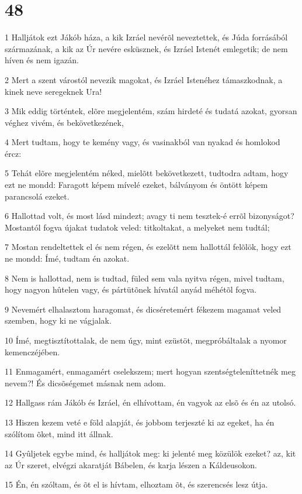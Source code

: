 \chapter{48}

\par 1 Halljátok ezt Jákób háza, a kik Izráel nevérõl neveztettek, és Júda forrásából származának, a kik az Úr nevére esküsznek, és Izráel Istenét emlegetik; de nem híven és nem igazán.
\par 2 Mert a szent várostól nevezik magokat, és Izráel Istenéhez támaszkodnak, a kinek neve seregeknek Ura!
\par 3 Mik eddig történtek, elõre megjelentém, szám hirdeté és tudatá azokat, gyorsan véghez vivém, és bekövetkezének,
\par 4 Mert tudtam, hogy te kemény vagy, és vasinakból van nyakad és homlokod ércz:
\par 5 Tehát elõre megjelentém néked, mielõtt bekövetkezett, tudtodra adtam, hogy ezt ne mondd: Faragott képem mívelé ezeket, bálványom és öntött képem parancsolá ezeket.
\par 6 Hallottad volt, és most lásd mindezt; avagy ti nem tesztek-é errõl bizonyságot? Mostantól fogva újakat tudatok veled: titkoltakat, a melyeket nem tudtál;
\par 7 Mostan rendeltettek el és nem régen, és ezelõtt nem hallottál felõlök, hogy ezt ne mondd: Ímé, tudtam én azokat.
\par 8 Nem is hallottad, nem is tudtad, füled sem vala nyitva régen, mivel tudtam, hogy nagyon hûtelen vagy, és pártütõnek hívatál anyád méhétõl fogva.
\par 9 Nevemért elhalasztom haragomat, és dicséretemért fékezem magamat veled szemben, hogy ki ne vágjalak.
\par 10 Ímé, megtisztítottalak, de nem úgy, mint ezüstöt, megpróbáltalak a nyomor kemenczéjében.
\par 11 Enmagamért, enmagamért cselekszem; mert hogyan szentségteleníttetnék meg nevem?! És dicsõségemet másnak nem adom.
\par 12 Hallgass rám Jákób és Izráel, én elhívottam, én vagyok az elsõ és én az utolsó.
\par 13 Hiszen kezem veté e föld alapját, és jobbom terjeszté ki az egeket, ha én szólítom õket, mind itt állnak.
\par 14 Gyûljetek egybe mind, és halljátok meg: ki jelenté meg közülök ezeket? az, kit az Úr szeret, elvégzi akaratját Bábelen, és karja lészen a Káldeusokon.
\par 15 Én, én szóltam, és õt el is hívtam, elhoztam õt, és szerencsés lesz útja.
